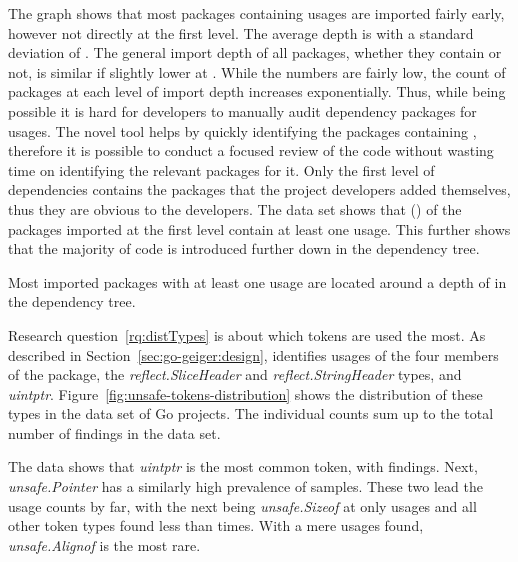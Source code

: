 

The graph shows that most packages containing \unsafe{} usages are imported fairly early, however not directly at the
first level.
The average depth is \averageUnsafeImportDepth{} with a standard deviation of \stdUnsafeImportDepth{}.
The general import depth of all packages, whether they contain \unsafe{} or not, is similar if slightly lower at
\averageGeneralImportDepth{}.
While the numbers are fairly low, the count of packages at each level of import depth increases exponentially.
Thus, while being possible it is hard for developers to manually audit dependency packages for \unsafe{} usages.
The novel \toolGeiger{} tool helps by quickly identifying the packages containing \unsafe{}, therefore it is possible to
conduct a focused review of the \unsafe{} code without wasting time on identifying the relevant packages for it.
Only the first level of dependencies contains the packages that the project developers added themselves, thus they are
obvious to the developers.
The data set shows that \levelOneImportedUnsafePackagesCount{} (\levelOneImportedUnsafePackagesShare{}) of the
\levelOneOmportedPackagesCount{} packages imported at the first level contain at least one \unsafe{} usage.
This further shows that the majority of \unsafe{} code is introduced further down in the dependency tree.

\begin{answerToRQ}[\ref{rq:depsDepth}]
    Most imported packages with at least one \unsafe{} usage are located around a depth of
    \averageUnsafeImportDepthRounded{} in the dependency tree.
\end{answerToRQ}

Research question~\ref{rq:distTypes} is about which \unsafe{} tokens are used the most.
As described in Section~\ref{sec:go-geiger:design}, \toolGeiger{} identifies usages of the four members of the \unsafe{}
package, the \textit{reflect.SliceHeader} and \textit{reflect.StringHeader} types, and \textit{uintptr}.
Figure~\ref{fig:unsafe-tokens-distribution} shows the distribution of these \unsafe{} types in the data set of Go
projects.
The individual counts sum up to the total number of \uniqueUnsafeFindings{} \unsafe{} findings in the data set.



The data shows that \textit{uintptr} is the most common \unsafe{} token, with  findings.
Next, \textit{unsafe.Pointer} has a similarly high prevalence of  samples.
These two lead the usage counts by far, with the next being \textit{unsafe.Sizeof} at only  usages and
all other token types found less than  times.
With a mere  usages found, \textit{unsafe.Alignof} is the most rare.

